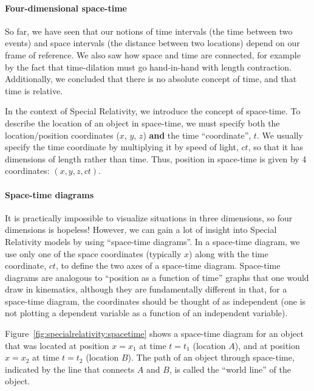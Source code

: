 
\paragraph{Four-dimensional space-time}

So far, we have seen that our notions of time intervals (the time between two events) and space intervals (the distance between two locations) depend on our frame of reference. We also saw how space and time are connected, for example by the fact that time-dilation must go hand-in-hand with length contraction. Additionally, we concluded that there is no absolute concept of time, and that time is relative.

In the context of Special Relativity, we introduce the concept of space-time. To describe the location of an object in space-time, we must specify both the location/position coordinates ($x$, $y$, $z$) \textbf{and} the time ``coordinate'', $t$. We usually specify the time coordinate by multiplying it by speed of light, $ct$, so that it has dimensions of length rather than time. Thus, position in space-time is given by 4 coordinates: $(x,y,z,ct)$.

\paragraph{Space-time diagrams}

It is practically impossible to visualize situations in three dimensions, so four dimensions is hopeless! However, we can gain a lot of insight into Special Relativity models by using ``space-time diagrams''. In a space-time diagram, we use only one of the space coordinates (typically $x$) along with the time coordinate, $ct$, to define the two axes of a space-time diagram. Space-time diagrams are analogous to ``position as a function of time'' graphs that one would draw in kinematics, although they are fundamentally different in that, for a space-time diagram, the coordinates should be thought of as independent (one is not plotting a dependent variable as a function of an independent variable).

Figure~\ref{fig:specialrelativity:spacetime} shows a space-time diagram for an object that was located at position $x=x_1$ at time $t=t_1$ (location $A$), and at position $x=x_2$ at time $t=t_2$ (location $B$). The path of an object through space-time, indicated by the line that connects $A$ and $B$, is called the ``world line'' of the object.

